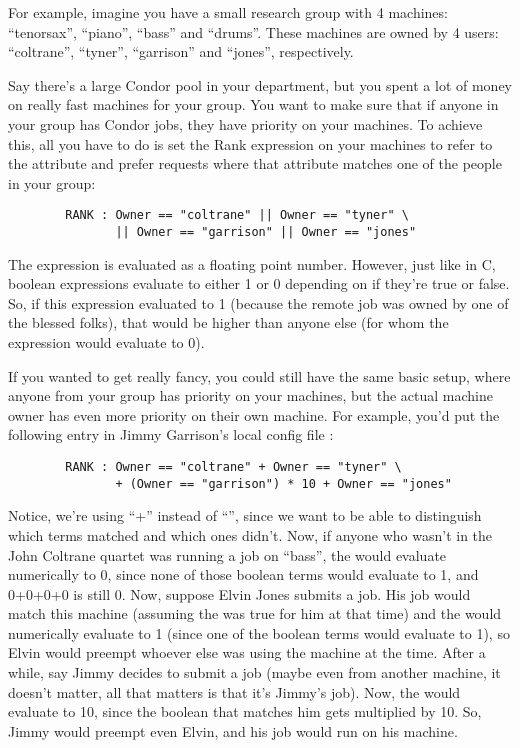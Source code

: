 For example, imagine you have a small research group with 4 machines:
``tenorsax'', ``piano'', ``bass'' and ``drums''.  These machines are
owned by 4 users: ``coltrane'', ``tyner'', ``garrison'' and ``jones'',
respectively.  

Say there's a large Condor pool in your department, but you spent a
lot of money on really fast machines for your group.  You want to make
sure that if anyone in your group has Condor jobs, they have priority
on your machines.  To achieve this, all you have to do is set the Rank
expression on your machines to refer to the  attribute and
prefer requests where that attribute matches one of the people in your
group:

\begin{verbatim}
        RANK : Owner == "coltrane" || Owner == "tyner" \
               || Owner == "garrison" || Owner == "jones"
\end{verbatim}

The  expression is evaluated as a floating point number.
However, just like in C, boolean expressions evaluate to either 1 or 0
depending on if they're true or false.  So, if this expression
evaluated to 1 (because the remote job was owned by one of the blessed
folks), that would be higher than anyone else (for whom the expression
would evaluate to 0).

If you wanted to get really fancy, you could still have the same basic
setup, where anyone from your group has priority on your machines, but
the actual machine owner has even more priority on their own machine.
For example, you'd put the following entry in Jimmy Garrison's local
config file \File{bass.local}:

\begin{verbatim}
        RANK : Owner == "coltrane" + Owner == "tyner" \
               + (Owner == "garrison") * 10 + Owner == "jones"
\end{verbatim}

Notice, we're using ``+'' instead of ``\Bar\Bar'', since we want to be able
to distinguish which terms matched and which ones didn't.  Now, if
anyone who wasn't in the John Coltrane quartet was running a job on
``bass'', the \Expr{RANK} would evaluate numerically to 0, since none
of those boolean terms would evaluate to 1, and 0+0+0+0 is still 0.
Now, suppose Elvin Jones submits a job.  His job would match this
machine (assuming the \Expr{START} was true for him at that time) and
the \Expr{RANK} would numerically evaluate to 1 (since one of the
boolean terms would evaluate to 1), so Elvin would preempt whoever
else was using the machine at the time.  After a while, say Jimmy
decides to submit a job (maybe even from another machine, it doesn't
matter, all that matters is that it's Jimmy's job).  Now, the
\Expr{RANK} would evaluate to 10, since the boolean that matches him
gets multiplied by 10.  So, Jimmy would preempt even Elvin, and his
job would run on his machine.

